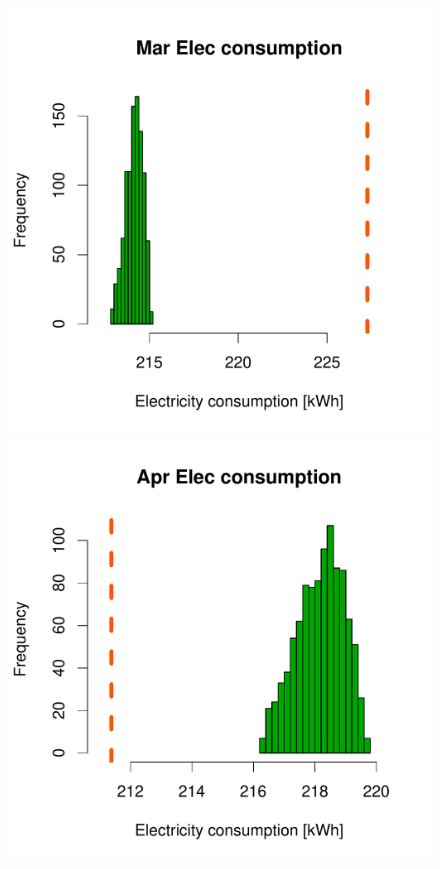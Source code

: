 \documentclass[a4paper, 12pt]{article}
\begin{document}
\begin{figure}
 \includegraphics[width=\scale]{Simulation_histograms/Batch_2_Only/Elec_Runs/Mar_Elec}\\
 \includegraphics[width=\scale]{Simulation_histograms/Batch_2_Only/Elec_Runs/Apr_Elec}

\end{figure}
\end{document}
